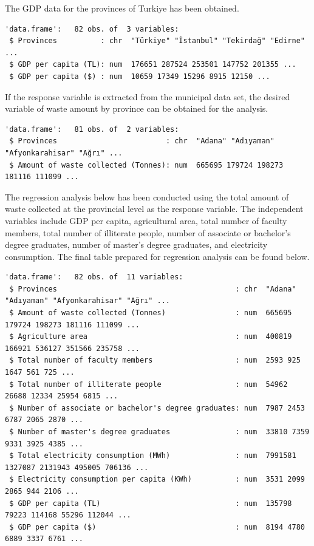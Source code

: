 \documentclass[
  11pt,
  a4paper,
  DIV=11,
  numbers=noendperiod]{scrartcl}
\begin{document}
{The GDP} data for the provinces of Turkiye has been obtained.

\begin{verbatim}
'data.frame':   82 obs. of  3 variables:
 $ Provinces          : chr  "Türkiye" "İstanbul" "Tekirdağ" "Edirne" ...
 $ GDP per capita (TL): num  176651 287524 253501 147752 201355 ...
 $ GDP per capita ($) : num  10659 17349 15296 8915 12150 ...
\end{verbatim}

If the {response variable} is extracted from the municipal data set, the
desired variable of {waste amount} by province can be obtained for the
analysis.

\begin{verbatim}
'data.frame':   81 obs. of  2 variables:
 $ Provinces                         : chr  "Adana" "Adıyaman" "Afyonkarahisar" "Ağrı" ...
 $ Amount of waste collected (Tonnes): num  665695 179724 198273 181116 111099 ...
\end{verbatim}

{The regression analysis} below has been conducted using the {total
amount of waste collected} at the provincial level as the response
variable. {The independent variables} include {GDP per capita,
agricultural area, total number of faculty members, total number of
illiterate people, number of associate or bachelor's degree graduates,
number of master's degree graduates, and electricity consumption}. The
final table prepared for regression analysis can be found below.

\begin{verbatim}
'data.frame':   82 obs. of  11 variables:
 $ Provinces                                         : chr  "Adana" "Adıyaman" "Afyonkarahisar" "Ağrı" ...
 $ Amount of waste collected (Tonnes)                : num  665695 179724 198273 181116 111099 ...
 $ Agriculture area                                  : num  400819 166921 536127 351566 235758 ...
 $ Total number of faculty members                   : num  2593 925 1647 561 725 ...
 $ Total number of illiterate people                 : num  54962 26688 12334 25954 6815 ...
 $ Number of associate or bachelor's degree graduates: num  7987 2453 6787 2065 2870 ...
 $ Number of master's degree graduates               : num  33810 7359 9331 3925 4385 ...
 $ Total electricity consumption (MWh)               : num  7991581 1327087 2131943 495005 706136 ...
 $ Electricity consumption per capita (KWh)          : num  3531 2099 2865 944 2106 ...
 $ GDP per capita (TL)                               : num  135798 79223 114168 55296 112044 ...
 $ GDP per capita ($)                                : num  8194 4780 6889 3337 6761 ...
\end{verbatim}
\end{document}
